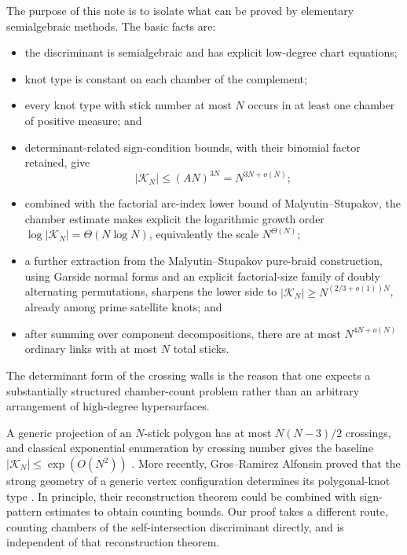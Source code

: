 \documentclass[11pt]{article}
\theoremstyle{remark}
\theoremstyle{plain}
\newcommand{\Kcal}{\mathcal{K}}
\begin{document}
The purpose of this note is to isolate what can be proved by elementary
semialgebraic methods.  The basic facts are:
\begin{itemize}
    \item the discriminant is semialgebraic and has explicit low-degree chart
    equations;
    \item knot type is constant on each chamber of the complement;
    \item every knot type with stick number at most \(N\) occurs in at least one
    chamber of positive measure; and
    \item determinant-related sign-condition bounds, with their binomial
    factor retained, give
    \[
        |\Kcal_N|\le (A N)^{3N}=N^{3N+o(N)};
    \]
    \item combined with the factorial arc-index lower bound of
    Malyutin--Stupakov, the chamber estimate makes explicit the logarithmic growth
    order
    \(\log|\Kcal_N|=\Theta(N\log N)\), equivalently the scale
    \(N^{\Theta(N)}\);
    \item a further extraction from the Malyutin--Stupakov pure-braid
    construction, using Garside normal forms and an explicit factorial-size
    family of doubly alternating permutations, sharpens the lower side to
    \(|\Kcal_N|\ge N^{(2/3+o(1))N}\), already among prime satellite knots;
    and
    \item after summing over component decompositions, there are at most
    \(N^{4N+o(N)}\) ordinary links with at most \(N\) total sticks.
\end{itemize}
The determinant form of the crossing walls is the reason that one expects a
substantially structured chamber-count problem rather than an arbitrary
arrangement of high-degree hypersurfaces.

A generic projection of an \(N\)-stick polygon has at most \(N(N-3)/2\)
crossings, and classical exponential enumeration by crossing number gives the
baseline \(|\Kcal_N|\le\exp(O(N^2))\) \cite{FreedmanHeWang}.  More recently,
Gros--Ramirez Alfonsin proved that the strong geometry of a generic vertex
configuration determines its polygonal-knot type \cite{GrosRamirez}.  In
principle, their reconstruction theorem could be combined with sign-pattern
estimates to obtain counting bounds.  Our proof takes a different route,
counting chambers of the self-intersection discriminant directly, and is
independent of that reconstruction theorem.
\end{document}
